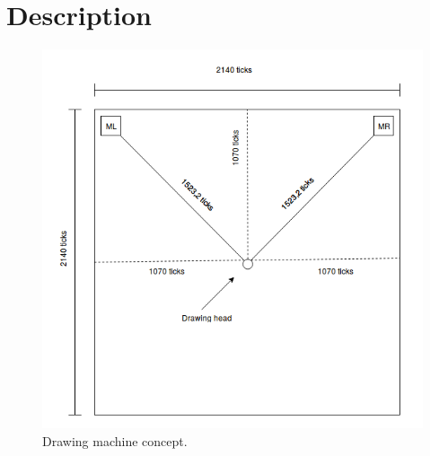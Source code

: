
\section{Description}
\begin{figure}[h]
\centering
\includegraphics[scale=0.30]{Images/DrawingMachine/Illustration.png}
\caption{ Drawing machine concept. }
\label{OverviewFigure}
\end{figure}

